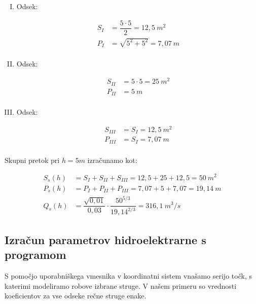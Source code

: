 \begin{enumerate}[I.]
	
	\item Odsek:
	
	\begin{ceqn}
		\begin{align}
		S_I&=\dfrac{5 \cdot 5}{2} = 12,5~m^2\\
		P_I&=\sqrt{5^2 + 5^2} = 7,07~m\\
		\end{align}
	\end{ceqn}
	
	\item Odsek:
	
	\begin{ceqn}
		\begin{align}
		S_{II}&=5\cdot5 = 25 ~m^2\\
		P_{II}&=5~m\\
		\end{align}
	\end{ceqn}
	
	\item Odsek:
	\begin{ceqn}
		\begin{align}
		S_{III}&=S_{I} = 12,5~m^2\\
		P_{III}&=S_{I} = 7,07~m\\
		\end{align}
	\end{ceqn}
	
\end{enumerate}

Skupni pretok pri $h=5m$ izračunamo kot:

\begin{ceqn}
	\begin{align}
	S_s(h) &= S_{I} + S_{II} + S_{III} = 12,5 + 25 + 12,5 = 50~m^2\\
	P_s(h) &= P_{I} + P_{II} + P_{III} = 7,07 + 5 + 7,07 = 19,14~m\\
	Q_s(h)&= \dfrac{\sqrt{0,01}}{0,03} \cdot \dfrac{50^{5/3}}{19,14^{2/3}} = 316,1~m^3/s
	\end{align}
\end{ceqn}




\subsection{Izračun parametrov hidroelektrarne s programom}

S pomočjo uporabniškega vmesnika v koordinatni sistem vnašamo serijo točk, s katerimi modeliramo robove izbrane struge. V našem primeru so vrednosti koeficientov za vse odseke rečne struge enake.

